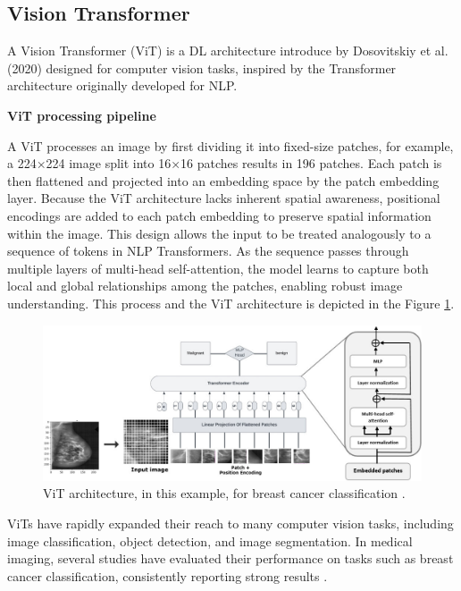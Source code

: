 \documentclass[a4paper,10pt]{book}
\begin{document}
\subsection{Vision Transformer}

A Vision Transformer (ViT) is a DL  architecture introduce by Dosovitskiy et al. (2020) \cite{dosovitskiy_image_2020} designed for computer vision tasks, inspired by the Transformer architecture originally developed for NLP. 

\textbf{ViT processing pipeline}

A ViT processes an image by first dividing it into fixed-size patches, for example, a 224×224 image split into 16×16 patches results in 196 patches. Each patch is then flattened and projected into an embedding space by the patch embedding layer. Because the ViT architecture lacks inherent spatial awareness, positional encodings are added to each patch embedding to preserve spatial information within the image. This design allows the input to be treated analogously to a sequence of tokens in NLP Transformers. As the sequence passes through multiple layers of multi-head self-attention, the model learns to capture both local and global relationships among the patches, enabling robust image understanding. This process and the ViT architecture is depicted in the Figure \ref{fig:vit_arch}.


\begin{figure}[h!]
    \centering
    \includegraphics[width=1.0\linewidth]{reports//assets/vit_breast.jpg}
    \caption[Vision Transformer Architecture]{ViT architecture, in this example, for breast cancer classification \cite{abimouloud_vision_2024}.}
    \label{fig:vit_arch}
\end{figure}

ViTs have rapidly expanded their reach to many computer vision tasks, including image classification, object detection, and image segmentation. In medical imaging, several studies have evaluated their performance on tasks such as breast cancer classification, consistently reporting strong results \cite{marquez_vara_vision_2024, mauricio_comparing_2023, ayana_vision-transformer-based_2023}.
\end{document}
